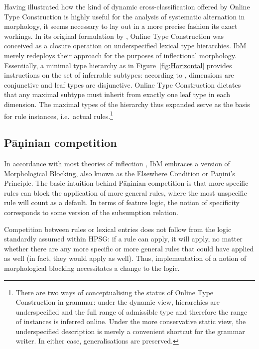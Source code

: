 \documentclass[output=paper
 	        ,biblatex
                ,babelshorthands
                ,newtxmath
                ,draftmode
                ,colorlinks, citecolor=brown
]{langscibook}
\begin{document}
\begin{exe}
\begin{xlist}
\begin{exe}
\begin{xlist}
Having illustrated how the kind of dynamic cross-classification
offered by Online Type Construction is highly useful for the analysis
of systematic alternation in morphology, it seems necessary to lay out
in a more precise fashion its exact workings. In its original
formulation by \citet{Koenig94,Koenig99}, Online Type Construction was conceived as a
closure operation on underspecified lexical type hierarchies. IbM
merely redeploys their approach for the purposes of inflectional
morphology. Essentially, a minimal type hierarchy as in
Figure~\ref{fig:Horizontal} provides instructions on the set of
inferrable subtypes: according to \citet{Koenig94}, dimensions are
conjunctive and leaf types are disjunctive. Online Type Construction
dictates that any maximal subtype must inherit from exactly one leaf
type in each dimension. The maximal types of the hierarchy thus
expanded serve as the basis for rule instances, i.e.\ actual
rules.\footnote{\label{fn:OTC}There are two ways of conceptualising the status of
  Online Type Construction in grammar: under the dynamic view, hierarchies are
  underspecified and the full range of admissible type and therefore
  the range of instances is inferred online. Under the more
  conservative static view, the underspecified description is merely a
  convenient shortcut for the grammar writer. In either case,
  generalisations are preserved.   
   }



\subsection{Pāṇinian competition}
\label{sec:Panini}

In accordance with most theories of inflection
\citep{Prince93,Stump01,Anderson92,Noyer92,kiparsky_p85}, IbM embraces
a version of Morphological Blocking, also known as the Elsewhere Condition
\citep{kiparsky_p85} or Pāṇini's Principle. The basic intuition behind
Pāṇinian competition is that more specific rules can block the
application of more general rules, where the most unspecific rule will
count as a default. In terms of feature logic, the notion of
specificity corresponds to some version of the subsumption relation.

Competition between rules or lexical entries does not follow from the
logic standardly assumed within HPSG: if a rule can apply, it will
apply, no matter whether there are any more specific or more general
rules that could have applied as well (in fact, they would apply as
well). Thus, implementation of a notion of morphological blocking
necessitates a change to the logic.


\end{xlist}
\end{exe}
\end{xlist}
\end{exe}
\end{document}
